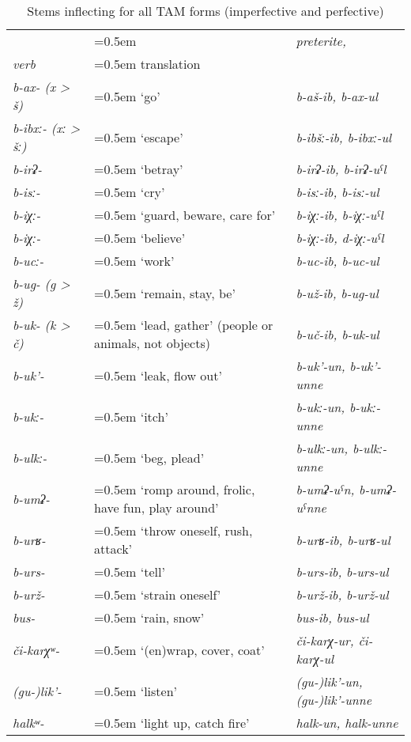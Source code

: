 \begin{table}
	\caption{Stems inflecting for all TAM forms (imperfective and perfective)}
	\label{tab:Stems inflecting for all TAM forms (imperfective and perfective)}
	\small
	\begin{tabularx}{0.98\textwidth}[]{%
		>{\raggedright\arraybackslash\itshape}p{70pt}
		>{\raggedright\arraybackslash\hangindent=0.5em}X
		>{\raggedright\arraybackslash\itshape}X}
		
		\lsptoprule
			{}
		&	{}
		&	\upshape preterite,\\
			\upshape verb
		&	\upshape translation
		&	\upshape \isit{imperfective converb}\\
		\midrule
			b-ax- (x > š) 	&	`go'				&	b-aš-ib, b-ax-ul\\
			b-ibxː- (xː > šː)	&	`escape'			&	b-ibšː-ib, b-ibxː-ul\\
			b-irʡ-			&	`betray'			&	b-irʡ-ib, b-irʡ-uˁl\\
			b-isː-			&	`cry' 				&	b-isː-ib, b-isː-ul\\
			b-iχː-			&	`guard, beware, care for'	&	b-iχː-ib, b-iχː-uˁl\\
			b-iχː-			&	`believe'			&	b-iχː-ib, d-iχː-uˁl\\
			b-ucː-			&	`work'				&	b-uc-ib, b-uc-ul\\
			b-ug- (g > ž)		&	`remain, stay, be'		&	b-už-ib, b-ug-ul\\
			b-uk- (k > č)		&	`lead, gather' (people or animals, not objects)	&	b-uč-ib, b-uk-ul\\
			b-uk'-			&	`leak, flow out'		&	b-uk'-un, b-uk'-unne\\
			b-ukː-			&	`itch'				&	b-ukː-un, b-ukː-unne\\
			b-ulkː-			&	`beg, plead'			&	b-ulkː-un, b-ulkː-unne\\
			b-umʡ-		&	`romp around, frolic, have fun, play around'	&	b-umʡ-uˁn, b-umʡ-uˁnne\\
			b-urʁ-			&	`throw oneself, rush, attack' &	b-urʁ-ib, b-urʁ-ul\\
			b-urs- 		&	`tell'				&	b-urs-ib, b-urs-ul\\
			b-urž-			&	`strain oneself'		&	b-urž-ib, b-urž-ul\\
			bus-			&	`rain, snow'			&	bus-ib, bus-ul\\
			či-karχʷ-		&	`(en)wrap, cover, coat'	&	či-karχ-ur, či-karχ-ul\\
			(gu-)lik'-		&	`listen'				&	(gu-)lik'-un, (gu-)lik'-unne\\
			halkʷ-			&	`light up, catch fire'		&	halk-un, halk-unne\\

\end{tabularx}
\end{table}
